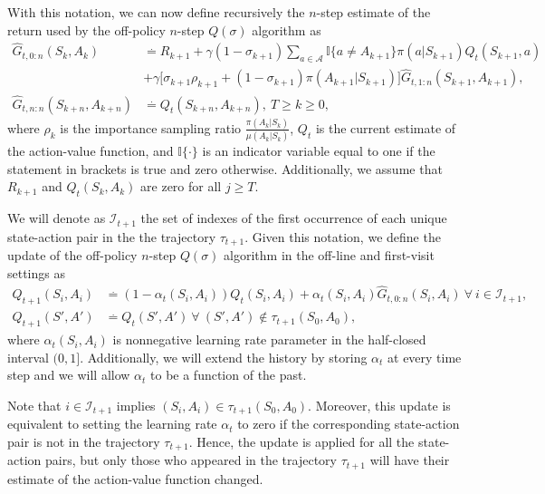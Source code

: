 With this notation, we can now define recursively the $n$-step estimate of the return used by the off-policy $n$-step $Q(\sigma)$ algorithm as
%
\begin{align}
\label{eq:recursive_return}
\hat{G}_{t, 0:n}(S_k, A_k) &\overset{.}{=}  R_{k+1} \nonumber 
+ \gamma(1-\sigma_{k+1})\sum_{a \in \mathcal{A}} \mathbb{I}\{a \neq A_{k+1}\} 
	\pi(a|S_{k+1})Q_t(S_{k+1}, a) \nonumber \\
&+ \gamma\big[\sigma_{k+1} \rho_{k+1} + (1-\sigma_{k+1}) \pi(A_{k+1}|S_{k+1})\big] \hat{G}_{t, 1:n} (S_{k+1}, A_{k+1}), \nonumber \\
%
\hat{G}_{t, n:n}(S_{k+n}, A_{k+n}) &\overset{.}{=} 
	Q_t(S_{k+n}, A_{k+n}), \ T \geq k \geq 0,
\end{align}
%
where $\rho_k$ is the importance sampling ratio $\frac{\pi(A_k|S_k)}{\mu(A_k|S_k)}$, $Q_t$ is the current estimate of the action-value function, and $\mathbb{I}\{ \cdot \}$ is an indicator variable equal to one if the statement in brackets is true and zero otherwise. 
Additionally, we assume that $R_{k+1}$ and $Q_t(S_k, A_k)$ are zero for all $j \geq T$.

We will denote as $\mathcal{I}_{t+1}$ the set of indexes of the first occurrence of each unique state-action pair in the the trajectory $\tau_{t+1}$. 
Given this notation, we define the update of the off-policy $n$-step $Q(\sigma)$ algorithm in the off-line and first-visit settings as
%
\begin{align}
\label{eq:nstep_update}
Q_{t+1}(S_i, A_i) &\overset{.}{=} (1-\alpha_t(S_i, A_{i})) Q_{t}(S_{i}, A_{i}) + 
	\alpha_t(S_{i}, A_{i}) \hat{G}_{t, 0:n}(S_{i}, A_{i})
    \ \forall \ i \in \mathcal{I}_{t+1}, \nonumber \\
Q_{t+1}(S', A') &\overset{.}{=} Q_t(S', A') \ \forall \ (S', A') \not\in \tau_{t+1}(S_0, A_0),
\end{align}
%
where $\alpha_t(S_i,A_i)$ is nonnegative learning rate parameter in the half-closed interval $(0,1]$.
Additionally, we will extend the history by storing $\alpha_t$ at every time step and we will allow $\alpha_t$ to be a function of the past.

Note that $i \in \mathcal{I}_{t+1}$ implies $(S_i, A_i) \in \tau_{t+1}(S_0, A_0)$. 
Moreover, this update is equivalent to setting the learning rate $\alpha_t$ to zero if the corresponding state-action pair is not in the trajectory $\tau_{t+1}$.
Hence, the update is applied for all the state-action pairs, but only those who appeared in the trajectory $\tau_{t+1}$ will have their estimate of the action-value function changed.

